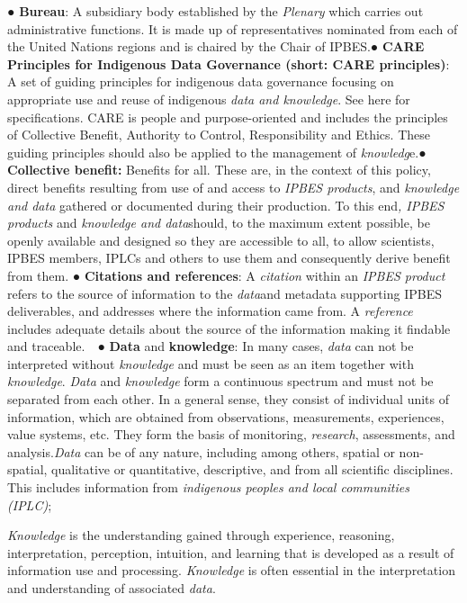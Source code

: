 \documentclass{article}
\begin{document}
● \textbf{Bureau}: A subsidiary body established by the \textit{Plenary }which carries out administrative functions. It is made up of representatives nominated from each of the United Nations regions and is chaired by the Chair of IPBES.● \textbf{CARE Principles for Indigenous Data Governance (short: CARE principles)}: A set of guiding principles for indigenous data governance focusing on appropriate use and reuse of indigenous \textit{data and knowledge}. See here for specifications. CARE is people and purpose-oriented and includes the principles of Collective Benefit, Authority to Control, Responsibility and Ethics. These guiding principles should also be applied to the management of \textit{knowledg}e.● \textbf{Collective benefit: }Benefits for all. These are, in the context of this policy, direct benefits resulting from use of and access to \textit{IPBES products}, and \textit{knowledge and data} gathered or documented during their production. To this end\textit{, IPBES products} and \textit{knowledge and data}should, to the maximum extent possible, be openly available and designed so they are accessible to all, to allow scientists, IPBES members, IPLCs and others to use them and consequently derive benefit from them. ● \textbf{Citations and references}: A \textit{citation }within an \textit{IPBES product} refers to the source of information to the \textit{data}and metadata supporting IPBES deliverables, and addresses where the information came from. A \textit{reference }includes adequate details about the source of the information making it findable and traceable.  ● \textbf{Data }and\textbf{ knowledge}: In many cases, \textit{data} can not be interpreted without \textit{knowledge} and must be seen as an item together with \textit{knowledge}. \textit{Data} and \textit{knowledge} form a continuous spectrum and must not be separated from each other. In a general sense, they consist of individual units of information, which are obtained from observations, measurements, experiences, value systems, etc. They form the basis of monitoring, \textit{research}, assessments, and analysis.\textit{Data }can be of any nature, including among others, spatial or non-spatial, qualitative or quantitative, descriptive, and from all scientific disciplines. This includes information from \textit{indigenous peoples and local communities (IPLC)}; 

\textit{Knowledge }is the understanding gained through experience, reasoning, interpretation, perception, intuition, and learning that is developed as a result of information use and processing. \textit{Knowledge} is often essential in the interpretation and understanding of associated \textit{data}.
\end{document}
